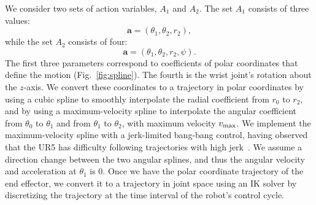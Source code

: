 \documentclass[letterpaper, 10 pt, conference]{ieeeconf}  %
\newcommand{\ba}{\mathbf{a}}
\newcommand{\vmax}{v_{\rm max}}
\newcommand{\remark}[3]{{\color{#2}[#1: #3]}}
\newcommand{\jonathan}[1]{\remark{Jonathan}{cyan}{#1}}
\begin{document}
We consider two sets of action variables, $A_1$ and $A_2$. The set $A_1$ consists of three values:
\begin{equation}\label{eq:act2}
    \ba = (\theta_1, \theta_2, r_2),
\end{equation}
while the set $A_2$ consists of four:
\begin{equation}\label{eq:act2_wrist}
    \ba = (\theta_1, \theta_2, r_2, \psi).
\end{equation}
The first three parameters correspond to coefficients of polar coordinates that define the motion (Fig.~\ref{fig:spline}).  The fourth is the wrist joint's rotation about the $z$-axis.  We convert these coordinates to a trajectory in polar coordinates by using a cubic spline to smoothly interpolate the radial coefficient from $r_0$ to $r_2$, and by using a maximum-velocity spline to interpolate the angular coefficient from $\theta_0$ to $\theta_1$ and from $\theta_1$ to $\theta_2$, with maximum velocity $\vmax$.  We implement the maximum-velocity spline with a jerk-limited bang-bang control, having observed that the UR5 has difficulty following trajectories with high jerk~\cite{ichnowski2020djgomp}. We assume a direction change between the two angular splines, and thus the angular velocity and acceleration at $\theta_1$ is 0.  Once we have the polar coordinate trajectory of the end effector, we convert it to a trajectory in joint space using an IK solver by discretizing the trajectory at the time interval of the robot's control cycle.
\end{document}
